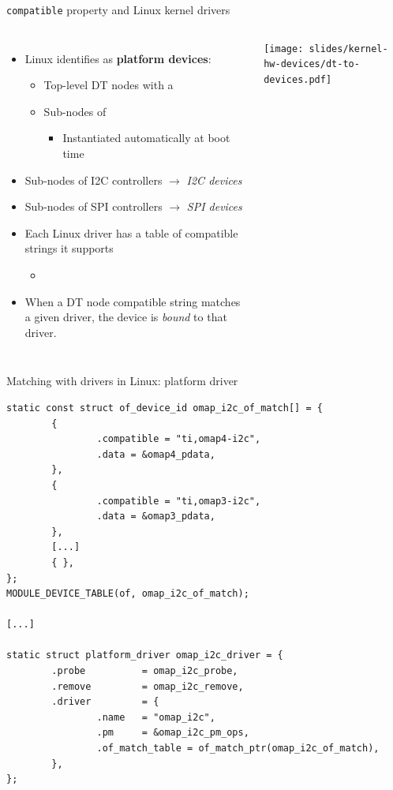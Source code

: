 \begin{frame}{{\tt compatible} property and Linux kernel drivers}
  \begin{columns}
    \begin{itemize}
    \item Linux identifies as {\bf platform devices}:
      \begin{itemize}
      \item Top-level DT nodes with a 
      \item Sub-nodes of 
        \begin{itemize}
        \item Instantiated automatically at boot time
        \end{itemize}
      \end{itemize}
    \item Sub-nodes of I2C controllers $\rightarrow$ {\em I2C devices}
    \item Sub-nodes of SPI controllers $\rightarrow$ {\em SPI devices}
    \item Each Linux driver has a table of compatible strings it supports
      \begin{itemize}
      \item {}\code{[]}
      \end{itemize}
    \item When a DT node compatible string matches a given driver, the
      device is {\em bound} to that driver.
    \end{itemize}
    \texttt{[image: slides/kernel-hw-devices/dt-to-devices.pdf]}
  \end{columns}
\end{frame}

\begin{frame}[fragile]{Matching with drivers in Linux: platform driver}
  \begin{block}{}
    {\tiny
\begin{verbatim}
static const struct of_device_id omap_i2c_of_match[] = {
        {
                .compatible = "ti,omap4-i2c",
                .data = &omap4_pdata,
        },
        {
                .compatible = "ti,omap3-i2c",
                .data = &omap3_pdata,
        },
        [...]
        { },
};
MODULE_DEVICE_TABLE(of, omap_i2c_of_match);

[...]

static struct platform_driver omap_i2c_driver = {
        .probe          = omap_i2c_probe,
        .remove         = omap_i2c_remove,
        .driver         = {
                .name   = "omap_i2c",
                .pm     = &omap_i2c_pm_ops,
                .of_match_table = of_match_ptr(omap_i2c_of_match),
        },
};
\end{verbatim}
    }
  \end{block}
\end{frame}

